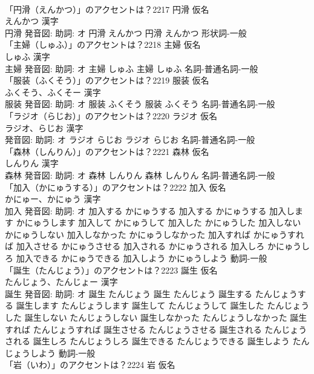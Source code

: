 \documentclass[8pt]{extreport}
\begin{document}
\begin{CJK}{UTF8}{min}
\\	「円滑（えんかつ）」のアクセントは？2217	円滑 仮名　
\\	えんかつ 漢字　
\\	円滑 発音図: 助詞: オ	円滑 えんかつ		円滑 えんかつ				形状詞-一般 
\\	「主婦（しゅふ）」のアクセントは？2218	主婦 仮名　
\\	しゅふ 漢字　
\\	主婦 発音図: 助詞: オ	主婦 しゅふ		主婦 しゅふ				名詞-普通名詞-一般 
\\	「服装（ふくそう）」のアクセントは？2219	服装 仮名　
\\	ふくそう、ふくそー 漢字　
\\	服装 発音図: 助詞: オ	服装 ふくそう		服装 ふくそう				名詞-普通名詞-一般 
\\	「ラジオ（らじお）」のアクセントは？2220	ラジオ 仮名　
\\	ラジオ、らじお 漢字　
\\	発音図: 助詞: オ	ラジオ らじお		ラジオ らじお				名詞-普通名詞-一般 
\\	「森林（しんりん）」のアクセントは？2221	森林 仮名　
\\	しんりん 漢字　
\\	森林 発音図: 助詞: オ	森林 しんりん		森林 しんりん				名詞-普通名詞-一般 
\\	「加入（かにゅうする）」のアクセントは？2222	加入 仮名　
\\	かにゅー、かにゅう 漢字　
\\	加入 発音図: 助詞: オ	加入する かにゅうする		加入する かにゅうする 加入します かにゅうします 加入して かにゅうして 加入した かにゅうした 加入しない かにゅうしない 加入しなかった かにゅうしなかった 加入すれば かにゅうすれば 加入させる かにゅうさせる 加入される かにゅうされる 加入しろ かにゅうしろ 加入できる かにゅうできる 加入しよう かにゅうしよう				動詞-一般 
\\	「誕生（たんじょう）」のアクセントは？2223	誕生 仮名　
\\	たんじょう、たんじょー 漢字　
\\	誕生 発音図: 助詞: オ	誕生 たんじょう		誕生 たんじょう 誕生する たんじょうする 誕生します たんじょうします 誕生して たんじょうして 誕生した たんじょうした 誕生しない たんじょうしない 誕生しなかった たんじょうしなかった 誕生すれば たんじょうすれば 誕生させる たんじょうさせる 誕生される たんじょうされる 誕生しろ たんじょうしろ 誕生できる たんじょうできる 誕生しよう たんじょうしよう				動詞-一般 
\\	「岩（いわ）」のアクセントは？2224	岩 仮名　

\end{CJK}
\end{document}
